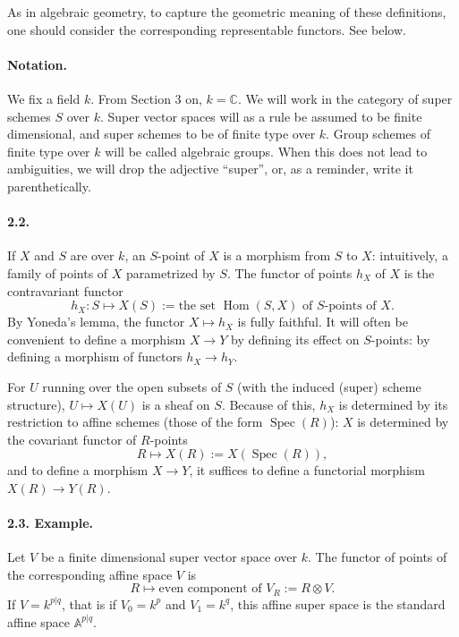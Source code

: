 \documentclass[11pt]{article}
\newcommand{\C}{\mathbb C}
\newcommand{\Spec}{\operatorname{Spec}}
\newcommand{\Hom}{\operatorname{Hom}}
\begin{document}
As in algebraic geometry, to capture the geometric meaning of these definitions, one should consider the corresponding representable functors. See below.

\paragraph{Notation.}
We fix a field $k$. From Section 3 on, $k=\C$. We will work in the category of super schemes $S$ over $k$. Super vector spaces will as a rule be assumed to be finite dimensional, and super schemes to be of finite type over $k$. Group schemes of finite type over $k$ will be called algebraic groups. When this does not lead to ambiguities, we will drop the adjective ``super'', or, as a reminder, write it parenthetically.

\paragraph{2.2.}
If $X$ and $S$ are over $k$, an $S$-point of $X$ is a morphism from $S$ to $X$: intuitively, a family of points of $X$ parametrized by $S$. The functor of points $h_X$ of $X$ is the contravariant functor
\[
h_X:S\longmapsto X(S):=\text{the set }\Hom(S,X)\text{ of }S\text{-points of }X.
\]
By Yoneda's lemma, the functor $X\mapsto h_X$ is fully faithful. It will often be convenient to define a morphism $X\to Y$ by defining its effect on $S$-points: by defining a morphism of functors $h_X\to h_Y$.

For $U$ running over the open subsets of $S$ (with the induced (super) scheme structure), $U\mapsto X(U)$ is a sheaf on $S$. Because of this, $h_X$ is determined by its restriction to affine schemes (those of the form $\Spec(R)$): $X$ is determined by the covariant functor of $R$-points
\[
R\longmapsto X(R):=X(\Spec(R)),
\]
and to define a morphism $X\to Y$, it suffices to define a functorial morphism $X(R)\to Y(R)$.

\paragraph{2.3. Example.}
Let $V$ be a finite dimensional super vector space over $k$. The functor of points of the corresponding affine space $V$ is
\[
R\longmapsto \text{even component of }V_R:=R\otimes V.
\]
If $V=k^{p|q}$, that is if $V_0=k^p$ and $V_1=k^q$, this affine super space is the standard affine space $\mathbb A^{p|q}$.
\end{document}
